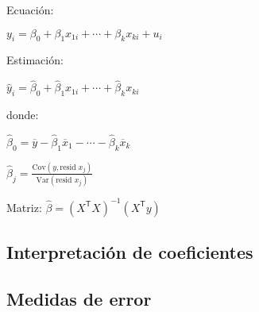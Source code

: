 \documentclass[10pt, a4paper, landscape]{extarticle}
\newcommand{\Var}{\mathrm{Var}}
\newcommand{\Cov}{\mathrm{Cov}}
\newcommand{\tr}{\mathsf{T}}
\begin{document}
\begin{multicols}{3}
\begin{multicols}{2}
\columnbreak

Ecuación:

\begin{center}
	$y_i = \beta_0 + \beta_1 x_{1i} + \cdots + \beta_k x_{ki} + u_i$
\end{center}

Estimación:

\begin{center}
	$\hat{y}_i = \hat{\beta}_0 + \hat{\beta}_1 x_{1i} + \cdots + \hat{\beta}_k x_{ki}$
\end{center}

donde:

\begin{center}
	$\hat{\beta}_0 = \overline{y} - \hat{\beta}_1 \overline{x}_1 - \cdots - \hat{\beta}_k \overline{x}_k$
	
	$\hat{\beta}_j = \frac{\Cov(y, \text{resid } x_j)}{\Var(\text{resid } x_j)}$
\end{center}

Matriz: $\hat{\beta} = (X^\tr X)^{-1} (X^\tr y)$

\end{multicols}

\subsection*{Interpretación de coeficientes}

\begin{center}
\end{center}

\subsection*{Medidas de error}


\end{multicols}
\end{document}
